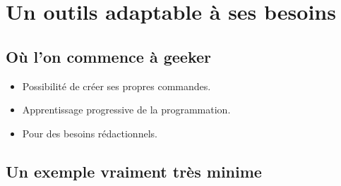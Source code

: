 \section{Un outils adaptable à ses besoins}

\subsection{Où l'on commence à geeker}

\begin{frame}
  \begin{itemize}
    \item Possibilité de créer ses propres commandes.
    \item Apprentissage progressive de la programmation.
    \item Pour des besoins rédactionnels.
  \end{itemize}
\end{frame}

\subsection{Un exemple vraiment très minime}
\begin{frame}
  \renewcommand{\index}[2][]{}
  \beamerdefaultoverlayspecification{}
  \inputminted{latex}{examples/prog.tex}
  
\end{frame}
